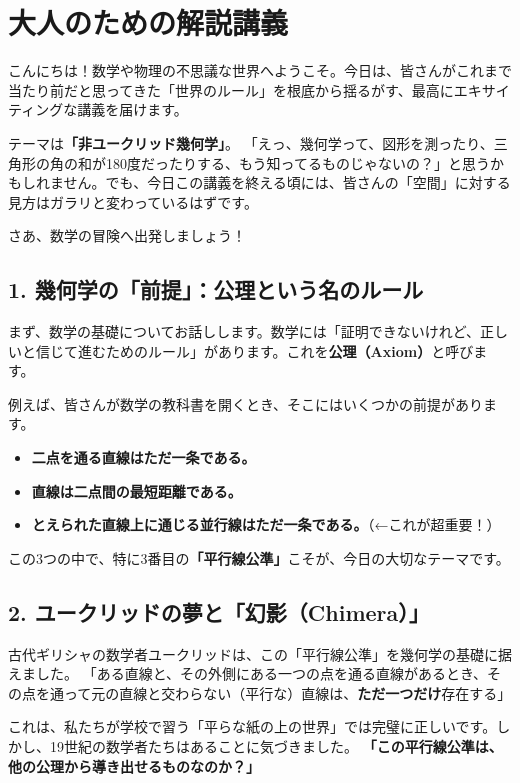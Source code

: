 \documentclass[a4paper,11pt,openany]{ltjsbook}
\begin{document}
\section{大人のための解説講義}
\begin{lecturebox}
こんにちは！数学や物理の不思議な世界へようこそ。今日は、皆さんがこれまで当たり前だと思ってきた「世界のルール」を根底から揺るがす、最高にエキサイティングな講義を届けます。

テーマは\textbf{「非ユークリッド幾何学」}。
「えっ、幾何学って、図形を測ったり、三角形の角の和が180度だったりする、もう知ってるものじゃないの？」と思うかもしれません。でも、今日この講義を終える頃には、皆さんの「空間」に対する見方はガラリと変わっているはずです。

さあ、数学の冒険へ出発しましょう！

\subsection*{1. 幾何学の「前提」：公理という名のルール}

まず、数学の基礎についてお話しします。数学には「証明できないけれど、正しいと信じて進むためのルール」があります。これを\textbf{公理（Axiom）}と呼びます。

例えば、皆さんが数学の教科書を開くとき、そこにはいくつかの前提があります。
\begin{itemize}[leftmargin=2em]
\item \textbf{二点を通る直線はただ一条である。}
\item \textbf{直線は二点間の最短距離である。}
\item \textbf{とえられた直線上に通じる並行線はただ一条である。}（←これが超重要！）
\end{itemize}

この3つの中で、特に3番目の\textbf{「平行線公準」}こそが、今日の大切なテーマです。

\subsection*{2. ユークリッドの夢と「幻影（Chimera）」}

古代ギリシャの数学者ユークリッドは、この「平行線公準」を幾何学の基礎に据えました。
「ある直線と、その外側にある一つの点を通る直線があるとき、その点を通って元の直線と交わらない（平行な）直線は、\textbf{ただ一つだけ}存在する」

これは、私たちが学校で習う「平らな紙の上の世界」では完璧に正しいです。しかし、19世紀の数学者たちはあることに気づきました。
\textbf{「この平行線公準は、他の公理から導き出せるものなのか？」}


\end{lecturebox}
\end{document}
